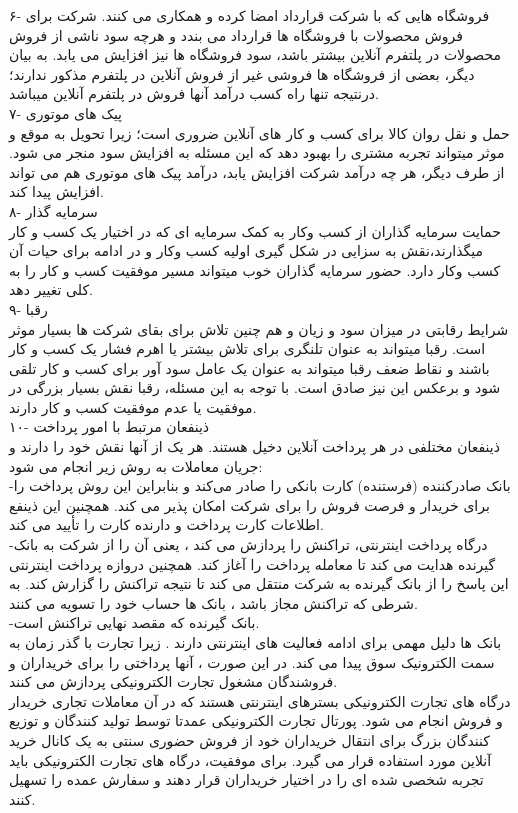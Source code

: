 \documentclass[12pt]{report}
\begin{document}
۶- فروشگاه هایی که با شرکت قرارداد امضا کرده و همکاری می کنند. 
شرکت برای فروش محصولات با فروشگاه ها قرارداد می بندد و هرچه سود ناشی از فروش محصولات در پلتفرم آنلاین بیشتر باشد، سود فروشگاه ها نیز افزایش می یابد. به بیان دیگر، بعضی از فروشگاه ها فروشی غیر از فروش آنلاین در پلتفرم مذکور ندارند؛ درنتیجه تنها راه کسب درآمد آنها فروش در پلتفرم آنلاین میباشد.\\
۷- پیک های موتوری \\
حمل و نقل روان کالا برای کسب و کار های آنلاین ضروری است؛ زیرا تحویل به موقع و موثر میتواند تجربه مشتری را بهبود دهد که این مسئله به افزایش سود منجر می شود. از طرف دیگر، هر چه درآمد شرکت افزایش یابد، درآمد پیک های موتوری هم می تواند افزایش پیدا کند.\\
۸- سرمایه گذار\\
حمایت سرمایه گذاران از کسب وکار به کمک سرمایه ای که در اختیار یک کسب و کار میگذارند،‌نقش به سزایی در شکل گیری اولیه کسب وکار و در ادامه برای حیات آن کسب وکار دارد. حضور سرمایه گذاران خوب میتواند مسیر موفقیت کسب و کار را به کلی تغییر دهد.\\
۹- رقبا\\
شرایط رقابتی در میزان سود و زیان و هم چنین تلاش برای بقای شرکت ها بسیار موثر است. رقبا میتواند به عنوان تلنگری برای تلاش بیشتر یا اهرم فشار یک کسب و کار باشند و نقاط ضعف رقبا میتواند به عنوان یک عامل سود آور برای کسب و کار تلقی شود و برعکس این نیز صادق است. با توجه به این مسئله، رقبا نقش بسیار بزرگی در موفقیت یا عدم موفقیت کسب و کار دارند.\\
۱۰- ذینفعان مرتبط با امور پرداخت\\
ذینفعان مختلفی در هر پرداخت آنلاین دخیل هستند. هر یک از آنها نقش خود را دارند و جریان معاملات به روش زیر انجام می شود:\\
-بانک صادرکننده (فرستنده) کارت بانکی را صادر می‌کند و بنابراین این روش پرداخت را برای خریدار و فرصت فروش را برای شرکت امکان پذیر می کند. همچنین این ذینفع اطلاعات کارت پرداخت و دارنده کارت را تأیید می کند. \\
-درگاه پرداخت اینترنتی، تراکنش را پردازش می کند ، یعنی آن را از شرکت به بانک گیرنده هدایت می کند تا معامله پرداخت را آغاز کند. همچنین دروازه پرداخت اینترنتی این پاسخ را از بانک گیرنده به شرکت منتقل می کند تا نتیجه تراکنش را گزارش کند. به شرطی که تراکنش مجاز باشد ، بانک ها حساب خود را تسویه می کنند.\\
-بانک گیرنده که مقصد نهایی تراکنش است.\\
بانک ها دلیل مهمی برای ادامه فعالیت های اینترنتی دارند . زیرا تجارت با گذر زمان به سمت الکترونیک سوق پیدا می کند. در این صورت ، آنها پرداختی را برای خریداران و فروشندگان مشغول تجارت الکترونیکی پردازش می كنند. \\
درگاه های تجارت الکترونیکی بسترهای اینترنتی هستند که در آن معاملات تجاری خریدار و فروش انجام می شود. پورتال تجارت الکترونیکی عمدتا توسط تولید کنندگان و توزیع کنندگان بزرگ برای انتقال خریداران خود از فروش حضوری سنتی به یک کانال خرید آنلاین مورد استفاده قرار می گیرد. برای موفقیت، درگاه های تجارت الکترونیکی باید تجربه شخصی شده ای را در اختیار خریداران قرار دهند و سفارش عمده را تسهیل کنند.
\end{document}
